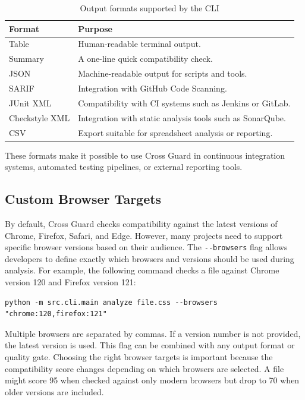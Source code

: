 \begin{table}[H]
    \centering
    \begin{tabular}{|l|l|}
        \hline
        \textbf{Format} & \textbf{Purpose} \\
        \hline \hline
        Table          & Human-readable terminal output. \\ \hline
        Summary        & A one-line quick compatibility check. \\ \hline
        JSON           & Machine-readable output for scripts and tools. \\ \hline
        SARIF          & Integration with GitHub Code Scanning. \\ \hline
        JUnit XML      & Compatibility with CI systems such as Jenkins or GitLab. \\ \hline
        Checkstyle XML & Integration with static analysis tools such as SonarQube. \\ \hline
        CSV            & Export suitable for spreadsheet analysis or reporting. \\ \hline
    \end{tabular}
    \caption{Output formats supported by the CLI}
    \label{tab:cli-formats}
\end{table}

These formats make it possible to use Cross Guard in continuous integration systems, automated testing pipelines, or external reporting tools.

\subsection{Custom Browser Targets}

By default, Cross Guard checks compatibility against the latest versions of Chrome, Firefox, Safari, and Edge. However, many projects need to support specific browser versions based on their audience. The \texttt{-{}-browsers} flag allows developers to define exactly which browsers and versions should be used during analysis. For example, the following command checks a file against Chrome version 120 and Firefox version 121:

\begin{lstlisting}[caption={Analyze against specific browser versions}, basicstyle=\ttfamily\small]
python -m src.cli.main analyze file.css --browsers "chrome:120,firefox:121"
\end{lstlisting}

Multiple browsers are separated by commas. If a version number is not provided, the latest version is used. This flag can be combined with any output format or quality gate. Choosing the right browser targets is important because the compatibility score changes depending on which browsers are selected. A file might score 95 when checked against only modern browsers but drop to 70 when older versions are included.
\newpage
